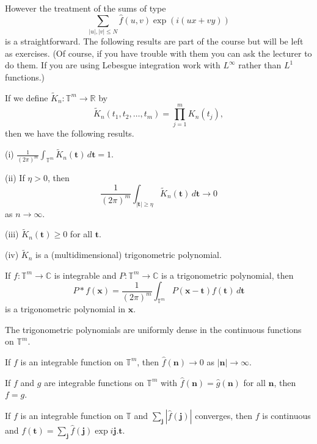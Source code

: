However the treatment of the sums of type
\[\sum_{|u|,|v|\leq N}\hat{f}(u,v)\exp(i(ux+vy))\]
is a straightforward. The following results
are part of the course but will be left as exercises.
(Of course, if you have trouble with them you
can ask the lecturer to do them. If you are using
Lebesgue integration work with $L^{\infty}$
rather than $L^{1}$ functions.)
\begin{lemma}\label{many start}
If we define $\tilde{K}_{n}:{\mathbb T}^{m}\rightarrow{\mathbb R}$
by
\[\tilde{K}_{n}(t_{1},t_{2},\dots,t_{m})=\prod_{j=1}^{m}K_{n}(t_{j}),\]
then we have the following results.

(i) ${\displaystyle \frac{1}{(2\pi)^{m}}\int_{{\mathbb T}^{m}}
\tilde{K}_{n}({\mathbf t})\, d{\mathbf t}=1}$.

(ii) If $\eta>0$, then
\[\frac{1}{(2\pi)^{m}}\int_{|{\mathbf t}|\geq\eta}\tilde{K}_{n}({\mathbf t})
\,d{\mathbf t}\rightarrow 0\]
as $n\rightarrow\infty$.

(iii) $\tilde{K}_{n}({\mathbf t})\geq 0$ for all ${\mathbf t}$.

(iv) $\tilde{K}_{n}$ is a (multidimensional) trigonometric
polynomial.
\end{lemma}
\begin{lemma}
If $f:{\mathbb T}^{m}\rightarrow{\mathbb C}$ is integrable
and $P:{\mathbb T}^{m}\rightarrow{\mathbb C}$ is a trigonometric
polynomial, then
\[P*f({\mathbf x})=\frac{1}{(2\pi)^{m}}\int_{{\mathbb T}^{m}}
P({\mathbf x}-{\mathbf t})f({\mathbf t})\, d{\mathbf t}\]
is a trigonometric polynomial in ${\mathbf x}$.
\end{lemma}
\begin{theorem}%
The trigonometric polynomials are
uniformly dense in the continuous functions on ${\mathbb T}^{m}$.
\end{theorem}
\begin{lemma} If $f$ is an
integrable function on ${\mathbb T}^{m}$, then
$\hat{f}({\mathbf n})\rightarrow 0$
as $|{\mathbf n}|\rightarrow\infty$.
\end{lemma}
\begin{theorem}[Uniqueness] If $f$ and $g$ are
integrable functions on ${\mathbb T}^{m}$ with
$\hat{f}({\mathbf n})=\hat{g}({\mathbf n})$
for all ${\mathbf n}$, then $f=g$.
\end{theorem}
\begin{lemma} If $f$ is an
integrable function on ${\mathbb T}$ and
$\sum_{{\mathbf j}}|\hat{f}({\mathbf j})|$ converges,
then $f$ is continuous
and $f({\mathbf t})=\sum_{{\mathbf j}}\hat{f}({\mathbf j})
\exp i{\mathbf j}.{\mathbf t}$.
\end{lemma}
